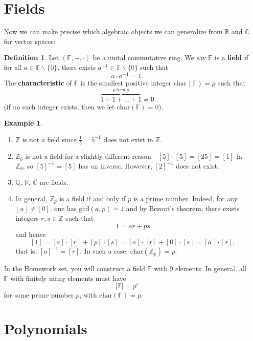 \documentclass[11pt,openany]{book}
\theoremstyle{plain}
\theoremstyle{definition}
\newtheorem{definition}[definition]{Definition}
\newtheorem{example}[example]{Example}
\theoremstyle{remark}
\begin{document}
\section{Fields}
Now we can make precise which algebraic objects we can generalize from $\mathbb{R}$ and $\mathbb{C}$ for vector spaces:
\begin{definition}
    Let $(\mathbb{F},+,\cdot)$ be a unital commutative ring. We say $\mathbb{F}$ is a {\bf field} if for all $a \in \mathbb{F} \backslash \{0\}$, there exists $a^{-1} \in \mathbb{F} \backslash \{0\}$ such that
    $$a \cdot a^{-1} = 1.$$
    The {\bf characteristic} of $\mathbb{F}$ is the smallest positive integer $\mathrm{char}(\mathbb{F}) = p$ such that 
    $$\overbrace{1+1+ \dots + 1}^{p\ terms} = 0$$ 
    (if no such integer exists, then we let $\mathrm{char}(\mathbb{F}) = 0$).
\end{definition}

\begin{example}
    \begin{enumerate}
        \item $\mathbb{Z}$ is not a field since $\frac{1}{5} = 5^{-1}$ does not exist in $\mathbb{Z}$. 
        \item $\mathbb{Z}_6$ is not a field for a slightly different reason - $[5] \cdot [5] = [25] = [1]$ in $\mathbb{Z}_6$, so $[5]^{-1} = [5]$ has an inverse. However, $[2]^{-1}$ does not exist.
        \item  $\mathbb{Q}$, $\mathbb{R}$, $\mathbb{C}$ are fields.
        \item In general, $\mathbb{Z}_p$ is a field if and only if $p$ is a prime number. Indeed, for any $[a] \neq [0]$, one has $\mathrm{gcd}(a,p) = 1$ and by Bezout's theorem, there exists integers $r, s \in \mathbb{Z}$ such that
        $$1 = ar + ps$$
        and hence 
        $$[1] = [a]\cdot [r] + [p]\cdot [s] = [a]\cdot [r] + [0]\cdot [s] = [a]\cdot [r],$$
        that is, $[a]^{-1} = [r]$.
        In such a case, $\mathrm{char}(\mathbb{Z}_p) = p$. 
    \end{enumerate}
\end{example}
In the Homework set, you will construct a field $\mathbb{F}$ with $9$ elements. In general, all $\mathbb{F}$ with finitely many elements must have
$$|\mathbb{F}| = p^r$$
for some prime number $p$, with $\mathrm{char}(\mathbb{F}) = p$.

\section{Polynomials}
\end{document}
